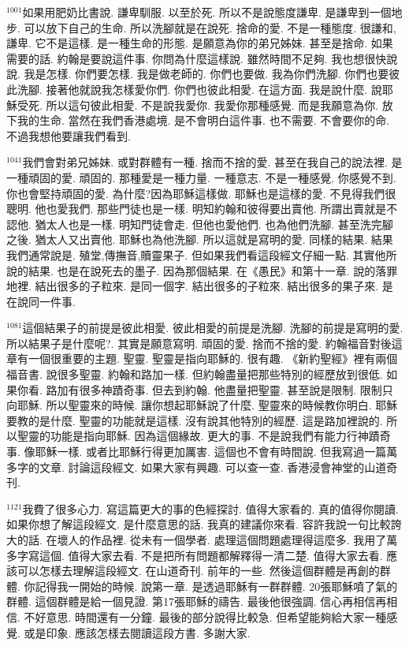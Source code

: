 \documentclass{book}
\begin{document}
$^{1001}$如果用肥奶比書說.
謙卑馴服.
以至於死.
所以不是說態度謙卑.
是謙卑到一個地步.
可以放下自己的生命.
所以洗腳就是在說死.
捨命的愛.
不是一種態度.
很謙和,謙卑.
它不是這樣.
是一種生命的形態.
是願意為你的弟兄姊妹.
甚至是捨命.
如果需要的話.
約翰是要說這件事.
你問為什麼這樣說.
雖然時間不足夠.
我也想很快說說.
我是怎樣.
你們要怎樣.
我是做老師的.
你們也要做.
我為你們洗腳.
你們也要彼此洗腳.
接著他就說我怎樣愛你們.
你們也彼此相愛.
在這方面.
我是說什麼.
說耶穌受死.
所以這句彼此相愛.
不是說我愛你.
我愛你那種感覺.
而是我願意為你.
放下我的生命.
當然在我們香港處境.
是不會明白這件事.
也不需要.
不會要你的命.
不過我想他要讓我們看到.

$^{1041}$我們會對弟兄姊妹.
或對群體有一種.
捨而不捨的愛.
甚至在我自己的說法裡.
是一種頑固的愛.
頑固的.
那種愛是一種力量.
一種意志.
不是一種感覺.
你感覺不到.
你也會堅持頑固的愛.
為什麼?因為耶穌這樣做.
耶穌也是這樣的愛.
不見得我們很聰明.
他也愛我們.
那些門徒也是一樣.
明知約翰和彼得要出賣他.
所謂出賣就是不認他.
猶太人也是一樣.
明知門徒會走.
但他也愛他們.
也為他們洗腳.
甚至洗完腳之後.
猶太人又出賣他.
耶穌也為他洗腳.
所以這就是寫明的愛.
同樣的結果.
結果我們通常說是.
殖堂,傳撫音,贖靈果子.
但如果我們看這段經文仔細一點.
其實他所說的結果.
也是在說死去的墨子.
因為那個結果.
在《愚民》和第十一章.
說的落罪地裡.
結出很多的子粒來.
是同一個字.
結出很多的子粒來.
結出很多的果子來.
是在說同一件事.

$^{1081}$這個結果子的前提是彼此相愛.
彼此相愛的前提是洗腳.
洗腳的前提是寫明的愛.
所以結果子是什麼呢?.
其實是願意寫明.
頑固的愛.
捨而不捨的愛.
約翰福音對後這章有一個很重要的主題.
聖靈.
聖靈是指向耶穌的.
很有趣.
《新約聖經》裡有兩個福音書.
說很多聖靈.
約翰和路加一樣.
但約翰盡量把那些特別的經歷放到很低.
如果你看.
路加有很多神蹟奇事.
但去到約翰.
他盡量把聖靈.
甚至說是限制.
限制只向耶穌.
所以聖靈來的時候.
讓你想起耶穌說了什麼.
聖靈來的時候教你明白.
耶穌要教的是什麼.
聖靈的功能就是這樣.
沒有說其他特別的經歷.
這是路加裡說的.
所以聖靈的功能是指向耶穌.
因為這個緣故.
更大的事.
不是說我們有能力行神蹟奇事.
像耶穌一樣.
或者比耶穌行得更加厲害.
這個也不會有時間說.
但我寫過一篇萬多字的文章.
討論這段經文.
如果大家有興趣.
可以查一查.
香港浸會神堂的山道奇刊.

$^{1121}$我費了很多心力.
寫這篇更大的事的色經探討.
值得大家看的.
真的值得你閱讀.
如果你想了解這段經文.
是什麼意思的話.
我真的建議你來看.
容許我說一句比較誇大的話.
在壞人的作品裡.
從未有一個學者.
處理這個問題處理得這麼多.
我用了萬多字寫這個.
值得大家去看.
不是把所有問題都解釋得一清二楚.
值得大家去看.
應該可以怎樣去理解這段經文.
在山道奇刊.
前年的一些.
然後這個群體是再創的群體.
你記得我一開始的時候.
說第一章.
是透過耶穌有一群群體.
20張耶穌噴了氣的群體.
這個群體是給一個見證.
第17張耶穌的禱告.
最後他很強調.
信心再相信再相信.
不好意思.
時間還有一分鐘.
最後的部分說得比較急.
但希望能夠給大家一種感覺.
或是印象.
應該怎樣去閱讀這段方書.
多謝大家.
\newpage
\end{document}
